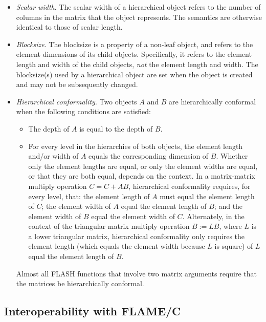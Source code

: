 \begin{itemize}
\item
{\em Scalar width}.
The scalar width of a hierarchical object refers to the number of columns in
the matrix that the object represents.
The semantics are otherwise identical to those of scalar length. 

\item
{\em Blocksize}.
The blocksize is a property of a non-leaf object, and refers to the element
dimensions of its child objects.
Specifically, it refers to the element length and width of the child objects,
{\em not} the element length and width.
The blocksize(s) used by a hierarchical object are set when the object is
created and may not be subsequently changed.

\item
{\em Hierarchical conformality}.
Two objects $ A $ and $ B $ are hierarchically conformal when the following
conditions are satisfied:
\begin{itemize}
\item
The depth of $ A $ is equal to the depth of $ B $.
\item
For every level in the hierarchies of both objects, the element length and/or
width of $ A $ equals the corresponding dimension of $ B $.
Whether only the element lengths are equal, or only the element widths are
equal, or that they are both equal, depends on the context.
In a matrix-matrix multiply operation $ C = C + A B $, hierarchical
conformality requires, for every level, that: the element length of $ A $
must equal the element length of $ C $; the element width of $ A $ equal
the element length of $ B $; and the element width of $ B $ equal the
element width of $ C $.
Alternately, in the context of the triangular matrix multiply operation
$ B := L B $, where $ L $ is a lower triangular matrix, hierarchical
conformality only requires the element length (which equals the element
width because $ L $ is square) of $ L $ equal the element length of $ B $.
\end{itemize}
Almost all FLASH functions that involve two matrix arguments require that
the matrices be hierarchically conformal.
\end{itemize}


\subsection{Interoperability with FLAME/C}


